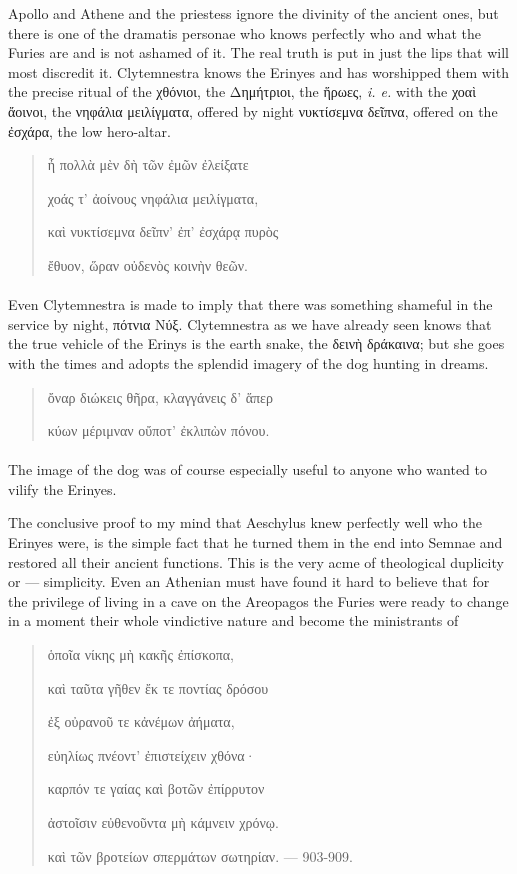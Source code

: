 \documentclass[a4paper, 11pt, oneside, polutonikogreek, english]{article}
\begin{document}
Apollo and Athene and the priestess ignore the divinity of the ancient ones, but there is one of the dramatis personae who knows perfectly who and what the Furies are and is not ashamed of it. The real truth is put in just the lips that will most discredit it. Clytemnestra knows the Erinyes and has worshipped them with the precise ritual of the χθόνιοι, the Δημήτριοι, the ἥρωες, \emph{i. e.} with the χοαὶ ἄοινοι, the νηφάλια μειλίγματα, offered by night νυκτίσεμνα δεῖπνα, offered on the ἐσχάρα, the low hero-altar.
\begin{quotation}
\large
ἦ πολλὰ μὲν δὴ τῶν ἐμῶν ἐλείξατε

χοάς τ' ἀοίνους νηφάλια μειλίγματα,

καὶ νυκτίσεμνα δεῖπν' ἐπ' ἐσχάρᾳ πυρὸς

ἔθυον, ὥραν οὐδενὸς κοινὴν θεῶν.
\end{quotation}
\paragraph{}
Even Clytemnestra is made to imply that there was something shameful in the service by night, πότνια Νύξ. Clytemnestra as we have already seen knows that the true vehicle of the Erinys is the earth snake, the δεινὴ δράκαινα; but she goes with the times and adopts the splendid imagery of the dog hunting in dreams.
\begin{quotation}
\large
ὄναρ διώκεις θῆρα, κλαγγάνεις δ' ἅπερ

κύων μέριμναν οὔποτ' ἐκλιπὼν πόνου.
\end{quotation}
\paragraph{}
The image of the dog was of course especially useful to anyone who wanted to vilify the Erinyes.

The conclusive proof to my mind that Aeschylus knew perfectly well who the Erinyes were, is the simple fact that he turned them in the end into Semnae and restored all their ancient functions. This is the very acme of theological duplicity or --- simplicity. Even an Athenian must have found it hard to believe that for the privilege of living in a cave on the Areopagos the Furies were ready to change in a moment their whole vindictive nature and become the ministrants of
\begin{quotation}
\large
ὁποῖα νίκης μὴ κακῆς ἐπίσκοπα,

καὶ ταῦτα γῆθεν ἔκ τε ποντίας δρόσου

ἐξ οὐρανοῦ τε κἀνέμων ἀήματα,

εὐηλίως πνέοντ' ἐπιστείχειν χθόνα·

καρπόν τε γαίας καὶ βοτῶν ἐπίρρυτον

ἀστοῖσιν εὐθενοῦντα μὴ κάμνειν χρόνῳ.

καὶ τῶν βροτείων σπερμάτων σωτηρίαν. --- 903-909.
\end{quotation}
\end{document}
